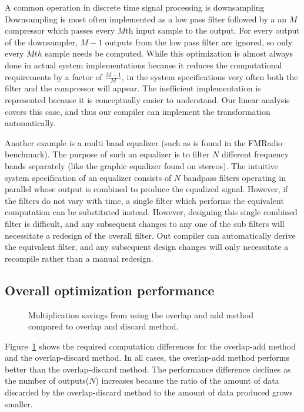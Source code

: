 A common operation in discrete time signal processing is downsampling
Downsampling is most often implemented as a low pass filter followed by a 
an $M$ compressor which passes every $M$th input sample to the output.
For every output of the downsampler, $M-1$ outputs from the low pass filter
are ignored, so only every $Mth$ sample needs be computed.
While this optimization is almost always done in actual system implementations because it reduces 
the computational requirements by a factor of $\frac{M-1}{M}$, in the system specifications
very often both the filter and the compressor will appear. The inefficient
implementation is represented because it is conceptually easier to understand. 
Our linear analysis covers this case, and thus our compiler can implement the transformation
automatically.

Another example is a multi band equalizer (such as is found in the FMRadio benchmark). 
The purpose of such an equalizer is to filter $N$ different frequency bands 
separately (like the graphic equalizer found on stereos). The intuitive system specification 
of an equalizer consists of $N$ bandpass filters operating in parallel whose output 
is combined to produce the equalized signal. However, if the filters do not vary with time, 
a single filter which performs the equivalent computation can be substituted instead. 
However, designing this single combined filter is difficult, and any subsequent changes to 
any one of the sub filters will necessitate a redesign of the overall filter. 
Out compiler can automatically derive the equivalent filter, and any subsequent design changes
will only necessitate a recompile rather than a manual redesign.


\subsection{Overall optimization performance}

\begin{figure}
\center
\epsfxsize=3.2in
\vspace{-12pt}
\caption{Multiplication savings from using the overlap and add method compared to overlap and discard method.}
\label{fig:overlap-add-savings}
\vspace{-12pt}
\end{figure}

Figure~\ref{fig:overlap-add-savings} shows the required computation differences for
the overlap-add method and the overlap-discard method. 
In all cases, the overlap-add method performs better than the overlap-discard method.
The performance difference declines as the number of outputs($N$) increases because
the ratio of the amount of data discarded by the overlap-discard method to the 
amount of data produced grows smaller. 

